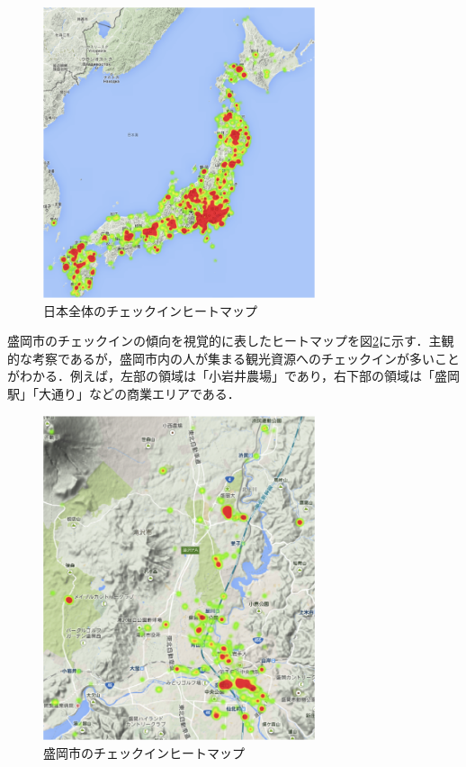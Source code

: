 \documentclass{jsarticle}
\begin{document}
\begin{figure}[!ht]
\begin{center}
\includegraphics[width=8.0cm]{./image/heatmap1.png}
\caption{日本全体のチェックインヒートマップ}
\label{heatmap1}
\end{center}
\end{figure}

盛岡市のチェックインの傾向を視覚的に表したヒートマップを図\ref{heatmap2}に示す．主観的な考察であるが，盛岡市内の人が集まる観光資源へのチェックインが多いことがわかる．例えば，左部の領域は「小岩井農場」であり，右下部の領域は「盛岡駅」「大通り」などの商業エリアである．

\begin{figure}[!ht]
\begin{center}
\includegraphics[width=8.0cm]{./image/heatmap2.png}
\caption{盛岡市のチェックインヒートマップ}
\label{heatmap2}
\end{center}
\end{figure}
\end{document}
